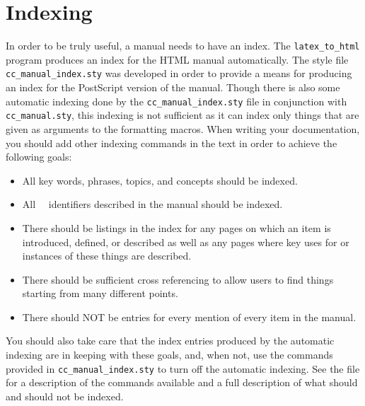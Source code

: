 \section{Indexing}
\label{sec:indexing}

In order to be truly useful, a manual needs to have an index.  The
{\tt latex\_to\_html} program produces an index for the HTML manual
automatically.  %
The style file {\tt cc\_manual\_index.sty}%
 was developed in order to provide
a means for producing an index for the PostScript version of the manual.
Though there is also some automatic indexing done by the
{\tt cc\_manual\_index.sty} file in conjunction with {\tt cc\_manual.sty},
this indexing is not sufficient as it can index only things that are
given as arguments to the formatting macros.  When writing your
documentation, you should add other indexing commands in the text in
order to achieve the following goals:
\begin{itemize}
   \item All key words, phrases, topics, and concepts should be indexed.
   \item All \cgal\ \CC\ identifiers described in the manual should be indexed.
   \item There should be listings in the index for any pages on which an
         item is introduced, defined, or described as well as any pages
         where key uses for or instances of these things are described.
   \item There should be sufficient cross referencing to allow users
         to find things starting from many different points.
   \item There should NOT be entries for every mention of every item in the
         manual.
\end{itemize}

You should also take care that the index entries produced by the automatic
indexing are in keeping with these goals, and, when not, use the commands
provided in {\tt cc\_manual\_index.sty} to turn off the automatic indexing.
See the file 
for a description of the commands available and a full description of what
should and should not be indexed.



